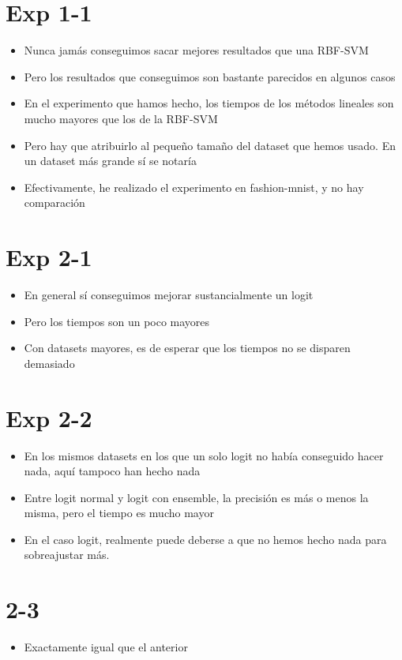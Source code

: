 \begin{note}
  \section*{Exp 1-1}
  \begin{itemize}
    \item Nunca jamás conseguimos sacar mejores resultados que una RBF-SVM
    \item Pero los resultados que conseguimos son bastante parecidos en algunos
    casos
    \item En el experimento que hamos hecho, los tiempos de los métodos lineales
    son mucho mayores que los de la RBF-SVM
    \item Pero hay que atribuirlo al pequeño tamaño del dataset que hemos usado.
    En un dataset más grande sí se notaría
    \item Efectivamente, he realizado el experimento en fashion-mnist, y no hay
    comparación
  \end{itemize}

  \section*{Exp 2-1}
  \begin{itemize}
    \item En general sí conseguimos mejorar sustancialmente un logit
    \item Pero los tiempos son un poco mayores
    \item Con datasets mayores, es de esperar que los tiempos no se disparen
    demasiado
  \end{itemize}

\section*{Exp 2-2}
\begin{itemize}
  \item En los mismos datasets en los que un solo logit no había conseguido hacer
  nada, aquí tampoco han hecho nada
  \item Entre logit normal y logit con ensemble, la precisión es más o menos la
  misma, pero el tiempo es mucho mayor
  \item En el caso logit, realmente puede deberse a que no hemos hecho nada
  para sobreajustar más.
\end{itemize}

\section*{2-3}
\begin{itemize}
  \item Exactamente igual que el anterior
\end{itemize}


\end{note}
